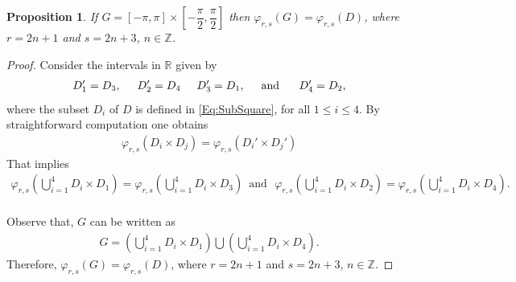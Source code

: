 \documentclass[reqno,11pt]{amsart}
\newtheorem{proposition}[theorem]{Proposition}
\begin{document}
{%

\begin{proposition}\label{Prop:DomainG}
    If $G=[-\pi,\pi]\times\left[-\dfrac{\pi}{2},\dfrac{\pi}{2}\right]$ then $\varphi_{r,s}(G) = \varphi_{r,s}(D)$, where $r=2n+1$ and $s=2 n+3$, $n \in \mathbb{Z}$.
\end{proposition}
\begin{proof}
Consider the intervals in $\mathbb{R}$ given by
\begin{eqnarray*}
D_1' = D_3, \hspace{0.5cm} D_2' = D_4\hspace{0.5cm} D_3' = D_1, \hspace{0.5cm}\mbox{and}\hspace{0.5cm}\ D_4' = D_2,   
\end{eqnarray*}
where the subset $D_i$ of $D$ is defined in \eqref{Eq:SubSquare}, for all $1 \leq i \leq 4$. By straightforward computation one obtains
\begin{eqnarray*}
   \varphi_{r,s}\left( D_i \times D_j\right) = \varphi_{r,s}\left( D_i' \times D_j'\right)  
\end{eqnarray*}
That implies
\begin{eqnarray*}
    \varphi_{r,s}\left( \bigcup_{i=1}^4 D_i \times D_1 \right) =  \varphi_{r,s} \left(\bigcup_{i=1}^4D_i \times D_3\right)\,\,\, \mbox{and} \,\, \, \,
    \varphi_{r,s}\left( \bigcup_{i=1}^4 D_i \times D_2 \right) =  \varphi_{r,s} \left(\bigcup_{i=1}^4D_i \times D_4\right).\\
\end{eqnarray*}

\noindent
Observe that, $G$ can be written as
\begin{eqnarray*}
    G = \left( \bigcup_{i=1}^4 D_i \times D_1 \right)\bigcup \left(\bigcup_{i=1}^4D_i \times D_4\right).
\end{eqnarray*}
Therefore, $\varphi_{r,s}(G) = \varphi_{r,s}(D)$, where $r=2n+1$ and $s=2 n+3$, $n \in \mathbb{Z}$.
\end{proof}

}
\end{document}
